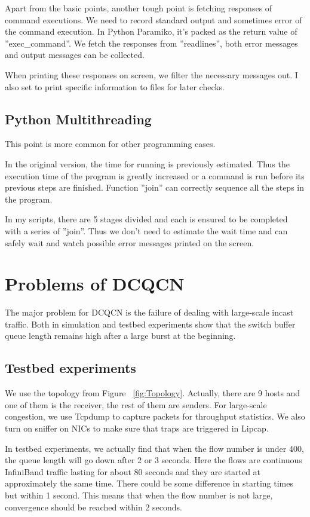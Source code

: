 \documentclass[12pt,a4paper]{article}
\begin{document}
Apart from the basic points, another tough point is fetching responses of command executions.
We need to record standard output and sometimes error of the command execution.
In Python Paramiko, it's packed as the return value of ''exec\_command''.
We fetch the responses from ''readlines'', both error messages and output messages can be collected.

When printing these responses on screen, we filter the necessary messages out.
I also set to print specific information to files for later checks.

\subsection{Python Multithreading}

This point is more common for other programming cases.

In the original version, the time for running is previously estimated.
Thus the execution time of the program is greatly increased or a command is run before its previous steps are finished.
Function ''join'' can correctly sequence all the steps in the program.

In my scripts, there are 5 stages divided and each is ensured to be completed with a series of ''join''.
Thus we don't need to estimate the wait time and can safely wait and watch possible error messages printed on the screen.


\newpage
\section{Problems of DCQCN}

The major problem for DCQCN is the failure of dealing with large-scale incast traffic.
Both in simulation \cite{NS3} and testbed experiments show that the switch buffer queue length remains high
after a large burst at the beginning.

\subsection{Testbed experiments}

We use the topology from Figure ~\ref{fig:Topology}.
Actually, there are 9 hosts and one of them is the receiver, the rest of them are senders.
For large-scale congestion, we use Tcpdump \cite{Tcpdump} to capture packets for throughput statistics.
We also turn on sniffer on NICs to make sure that traps are triggered in Lipcap.

In testbed experiments, we actually find that when the flow number is under 400, the queue length will go down after 2 or 3 seconds.
Here the flows are continuous InfiniBand traffic lasting for about 80 seconds and they are started at approximately the same time.
There could be some difference in starting times but within 1 second.
This means that when the flow number is not large, convergence should be reached within 2 seconds.
\end{document}
